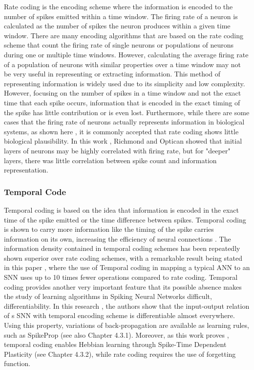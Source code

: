 \documentclass[12pt]{report}
\begin{document}
Rate coding is the encoding scheme where the information is encoded to the number of spikes emitted within a time window. The firing rate of a neuron is calculated as the number of spikes the neuron produces within a given time window. There are many encoding algorithms that are based on the rate coding scheme that count the firing rate of single neurons or populations of neurons during one or multiple time windows. However, calculating the average firing rate of a population of neurons with similar properties over a time window may not be very useful in representing or extracting information. This method of representing information is widely used due to its simplicity and low complexity. However, focusing on the number of spikes in a time window and not the exact time that each spike occurs, information that is encoded in the exact timing of the spike has little contribution or is even lost. Furthermore, while there are some cases that the firing rate of neurons actually represents information in biological systems, as shown here \cite{Huxter2003}, it is commonly accepted that rate coding shows little biological plausibility. In this work \cite{Richmond1987}, Richmond and Optican showed that initial layers of neurons may be highly correlated with firing rate, but for "deeper" layers, there was little correlation between spike count and information representation. 

\subsubsection{Temporal Code}

Temporal coding is based on the idea that information is encoded in the exact time of the spike emitted or the time difference between spikes. Temporal coding is shown to carry more information like the timing of the spike carries information on its own, increasing the efficiency of neural connections \cite{Mainen2009}. The information density contained in temporal coding schemes has been repeatedly shown superior over rate coding schemes, with a remarkable result being stated in this paper \cite{IEEE2018}, where the use of Temporal coding in mapping a typical ANN to an SNN uses up to 10 times fewer operations compared to rate coding. Temporal coding provides another very important feature that its possible absence makes the study of learning algorithms in Spiking Neural Networks difficult, differentiability. In this research \cite{Mostafa2018}, the authors show that the input-output relation of s SNN with temporal encoding scheme is differentiable almost everywhere. Using this property, variations of back-propagation are available as learning rules, such as SpikeProp \cite{Bohte2002} (see also Chapter 4.3.1). Moreover, as this work proves \cite{Lobov2020}, temporal coding enables Hebbian learning through Spike-Time Dependent Plasticity (see Chapter 4.3.2), while rate coding requires the use of forgetting function.
\end{document}
